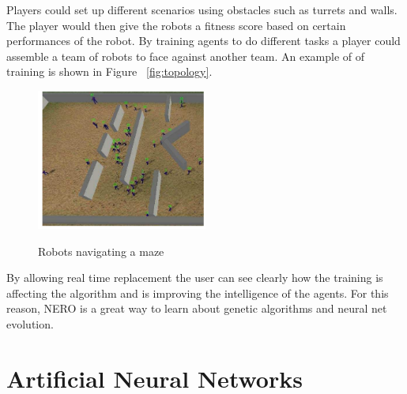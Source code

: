 \documentclass[12pt]{ucthesis} \newif\ifpdf \ifx\pdfoutput\undefined
\begin{document}
Players could set up different scenarios using obstacles such as turrets and
walls. The player would then give the robots a fitness score based on certain
performances of the robot. By training agents to do different tasks a player
could assemble a team of robots to face against another team. An example of of
training is shown in Figure ~\ref{fig:topology}.

\begin{figure}[h!] 
\caption{Robots navigating a maze}
  \centering
    \includegraphics[width=0.5\textwidth]{robot.png}
   \label{fig:robot} 
\end{figure}

By allowing real time replacement the user can see clearly how the training is
affecting the algorithm and is improving the intelligence of the agents. For
this reason, NERO is a great way to learn about genetic algorithms and neural
net evolution.
 
\section{Artificial Neural Networks}
\end{document}
